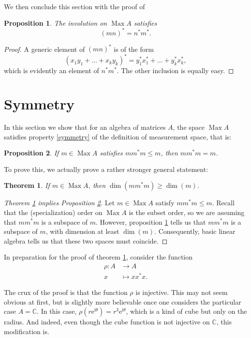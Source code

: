 \documentclass{article}
\theoremstyle{plain}
\newtheorem{theorem}{Theorem}
\newtheorem{prop}{Proposition}
\theoremstyle{nonumberplain}
\newtheorem{proof}{Proof}
\DeclareMathOperator{\Max}{Max}
\newcommand{\C}{\mathbb{C}}
\newcommand{\e}{\mathrm{e}}
\newcommand{\I}{\mathrm{i}}
\begin{document}
We then conclude this section with the proof of
\begin{prop}
The involution on $\Max A$ satisfies
\[ (mn)^* = n^* m^*.\]
\end{prop}

\begin{proof}
A generic element of $(mn)^*$ is of the form
\[(x_1 y_1 + \dots + x_k y_k)^* = y_1^* x_1^* + \dots + y_k^* x_k^*,\]
which is evidently an element of $n^* m^*$. The other inclusion is equally easy.
\end{proof}

\section{Symmetry}

In this section we show that for an algebra of matrices $A$, the space $\Max A$ satisfies property \ref{symmetry} of the definition of measurement space, that is:
\begin{prop}\label{propsymmetry}
If $m \in \Max A$ satisfies $m m^* m \leq m$, then $m m^* m = m$.
\end{prop}

To prove this, we actually prove a rather stronger general statement:

\begin{theorem}\label{propstrongsymmetry}
If $m \in \Max A$, then $\dim(m m^* m) \geq \dim(m)$.
\end{theorem}

\begin{proof}[Theorem \ref{propstrongsymmetry} implies Proposition \ref{propsymmetry}]
Let $m \in \Max A$ satisfy $m m^* m \leq m$. Recall that the (specialization) order on $\Max A$ is the subset order, so we are assuming that $m m^* m$ is a subspace of $m$. However, proposition \ref{propstrongsymmetry} tells us that $m m^* m$ is a subspace of $m$, with dimension at least $\dim(m)$. Consequently, basic linear algebra tells us that these two spaces must coincide.
\end{proof}

In preparation for the proof of theorem \ref{propstrongsymmetry}, consider the function
\begin{align*}
\rho \colon A &\to A\\
x &\mapsto x x^* x.
\end{align*}

The crux of the proof is that the function $\rho$ is injective. This may not seem obvious at first, but is slightly more believable once one considers the particular case $A = \C$. In this case, $\rho(r \e^{\I \theta}) = r^3 \e^{\I \theta}$, which is a kind of cube but only on the radius. And indeed, even though the cube function is not injective on $\C$, this modification is.
\end{document}

